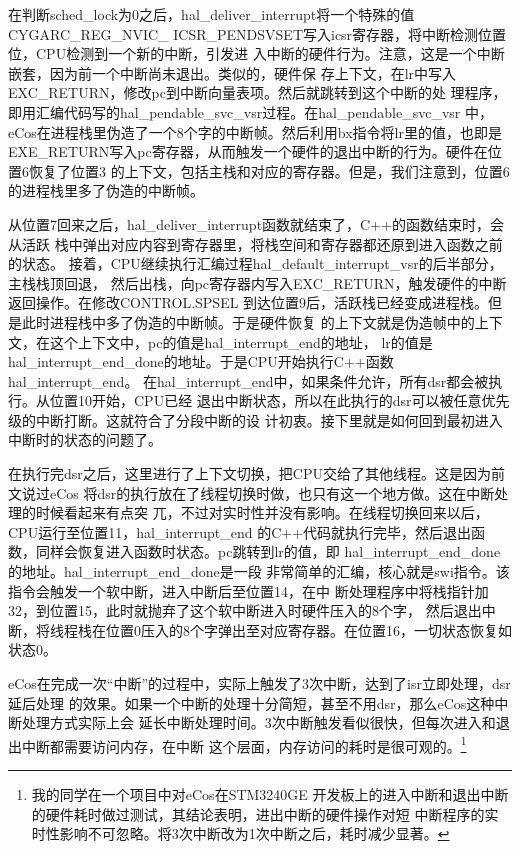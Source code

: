 在判断sched\_lock为0之后，hal\_deliver\_interrupt将一个特殊的值CYGARC\_REG\_NVIC\_
ICSR\_PENDSVSET写入icsr寄存器，将中断检测位置位，CPU检测到一个新的中断，引发进
入中断的硬件行为。注意，这是一个中断嵌套，因为前一个中断尚未退出。类似的，硬件保
存上下文，在lr中写入EXC\_RETURN，修改pc到中断向量表项。然后就跳转到这个中断的处
理程序，即用汇编代码写的hal\_pendable\_svc\_vsr过程。在hal\_pendable\_svc\_vsr
中，eCos在进程栈里伪造了一个8个字的中断帧。然后利用bx指令将lr里的值，也即是
EXE\_RETURN写入pc寄存器，从而触发一个硬件的退出中断的行为。硬件在位置6恢复了位置3
的上下文，包括主栈和对应的寄存器。但是，我们注意到，位置6的进程栈里多了伪造的中断帧。

从位置7回来之后，hal\_deliver\_interrupt函数就结束了，C++的函数结束时，会从活跃
栈中弹出对应内容到寄存器里，将栈空间和寄存器都还原到进入函数之前的状态。\cite{AAPCS}
接着，CPU继续执行汇编过程hal\_default\_interrupt\_vsr的后半部分，主栈栈顶回退，
然后出栈，向pc寄存器内写入EXC\_RETURN，触发硬件的中断返回操作。在修改CONTROL.SPSEL
到达位置9后，活跃栈已经变成进程栈。但是此时进程栈中多了伪造的中断帧。于是硬件恢复
的上下文就是伪造帧中的上下文，在这个上下文中，pc的值是hal\_interrupt\_end的地址，
lr的值是hal\_interrupt\_end\_done的地址。于是CPU开始执行C++函数hal\_interrupt\_end。
在hal\_interrupt\_end中，如果条件允许，所有dsr都会被执行。从位置10开始，CPU已经
退出中断状态，所以在此执行的dsr可以被任意优先级的中断打断。这就符合了分段中断的设
计初衷。接下里就是如何回到最初进入中断时的状态的问题了。

在执行完dsr之后，这里进行了上下文切换，把CPU交给了其他线程。这是因为前文说过eCos
将dsr的执行放在了线程切换时做，也只有这一个地方做。这在中断处理的时候看起来有点突
兀，不过对实时性并没有影响。在线程切换回来以后，CPU运行至位置11，hal\_interrupt\_end
的C++代码就执行完毕，然后退出函数，同样会恢复进入函数时状态。pc跳转到lr的值，即
hal\_interrupt\_end\_done的地址。\cite{AAPCS}hal\_interrupt\_end\_done是一段
非常简单的汇编，核心就是swi指令。该指令会触发一个软中断，进入中断后至位置14，在中
断处理程序中将栈指针加32，到位置15，此时就抛弃了这个软中断进入时硬件压入的8个字，
然后退出中断，将线程栈在位置0压入的8个字弹出至对应寄存器。在位置16，一切状态恢复如
状态0。

eCos在完成一次“中断”的过程中，实际上触发了3次中断，达到了isr立即处理，dsr延后处理
的效果。如果一个中断的处理十分简短，甚至不用dsr，那么eCos这种中断处理方式实际上会
延长中断处理时间。3次中断触发看似很快，但每次进入和退出中断都需要访问内存，在中断
这个层面，内存访问的耗时是很可观的。\footnote{我的同学在一个项目中对eCos在STM3240GE
开发板上的进入中断和退出中断的硬件耗时做过测试，其结论表明，进出中断的硬件操作对短
中断程序的实时性影响不可忽略。将3次中断改为1次中断之后，耗时减少显著。}

